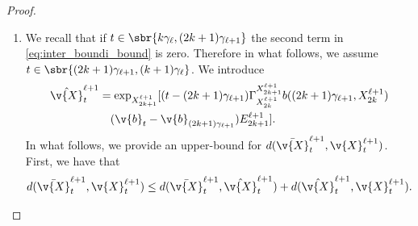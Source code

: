 \begin{proof}{}{}
\begin{enumerate}[wide, labelindent=0pt, label=(\alph*)]
		      Combining these results and \eqref{eq:upper_bound_distance_cheng_duo} we get that \begin{align}  & d(\bar{\v{X}}_{t}^{\ell+1}, \v{X}_{t}^\ell)^2 \leq (1 +C \kappa_k^2 \exp[4 \kappa_k]) d(X_k^\ell,X_{2k}^{\ell+1})^2 \\ & \qquad \qquad \qquad + C \exp[4 \kappa_k] \mathtt{m}{L}_1^2 \gamma_\ell^2 d(X_k^\ell, X_{2k}^{\ell+1})^2 \\ & \qquad \qquad \qquad + 2 \mathtt{m}{L}_1 \gamma_\ell d(X_k^\ell, X_{2k}^{\ell+1})d(X_k^\ell, X_{2k}^{\ell+1}) \\ & \qquad \qquad \leq (1 +C \kappa_k^2 \exp[4 \kappa_k] + 2C \exp[4 \kappa_k] \mathtt{m}{L}_1^2 \gamma_\ell^2) d(X_k^\ell,X_{2k}^{\ell+1})^2 \\ & \qquad \qquad \qquad + 2 \mathtt{m}{L}_1 \gamma_\ell d(X_k^\ell, X_{2k}^{\ell+1})^2 + 2 \mathtt{m}{L}_2^2 \gamma_\ell^4 \\ & \qquad \qquad \leq (1 +C \kappa_k^2 \exp[4 \kappa_k] + 2C \exp[4 \kappa_k] \mathtt{m}{L}_1^2 \gamma_\ell^2 + 2 \mathtt{m}{L}_1 \gamma_\ell) d(X_k^\ell,X_{2k}^{\ell+1})^2 .
		      \end{align}
		      Hence, there exists \(C_1 \geq 0\) (not dependent on \(k\) or \(\ell\)) such that for any \(t \in \sbr{k \gamma_\ell, (k+1) \gamma_\ell}\) \begin{equation}\label{eq:case_complete} (1 + 2^{-\ell}) d(\bar{\v{X}}_{t}^{\ell+1}, \v{X}_{t}^\ell)^2 \leq (1 +C_1\{ \kappa_k^2 \exp[4 \kappa_k] + \gamma_\ell^2 \exp[4\kappa_k] + 2^{-\ell}\}) d(X_k^\ell,X_{2k}^{\ell+1})^2 + C_1 \gamma_\ell^3 .
		      \end{equation}
		\item We recall that if \(t \in \sbr{k \gamma_{\ell}, (2k+1) \gamma_{\ell+1}}\)
		      the second term in \eqref{eq:inter_boundi_bound} is zero.
		      Therefore in what follows, we assume \(t \in \sbr{(2k+1) \gamma_{\ell+1}, (k+1) \gamma_\ell}\).
		      We introduce \begin{align} \hat{\v{X}}_{t}^{\ell+1} & = \exp_{X_{2k+1}^{\ell+1}}[(t - (2k+1)\gamma_{\ell+1}) \Gamma_{X_{2k}^{\ell+1}}^{X_{2k+1}^{\ell+1}} b((2k+1)\gamma_{\ell+1}, X_{2k}^{\ell+1}) \\  & \quad (\v{b}_{t} - \v{b}_{(2k+1) \gamma_{\ell+1}}) E_{2k+1}^{\ell+1}] .
                 \label{eq:hat_X_redef}
		      \end{align}
		      In what follows, we provide an upper-bound for \(d(\bar{\v{X}}_{t}^{\ell+1}, \v{X}_{t}^{\ell+1})\).
		      First, we have that \begin{equation} d(\bar{\v{X}}_{t}^{\ell+1}, \v{X}_{t}^{\ell+1}) \leq d(\bar{\v{X}}_{t}^{\ell+1}, \hat{\v{X}}_{t}^{\ell+1}) + d(\hat{\v{X}}_{t}^{\ell+1}, \v{X}_{t}^{\ell+1}) .

\end{equation}
\end{enumerate}
\end{proof}
